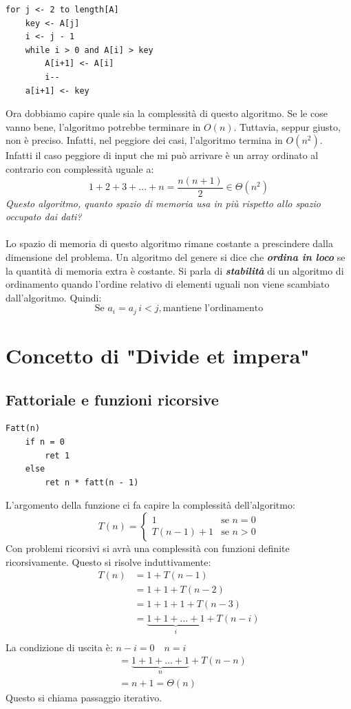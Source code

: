 \documentclass[a4paper]{article}
\begin{document}
\begin{lstlisting}
for j <- 2 to length[A]
    key <- A[j]
    i <- j - 1
    while i > 0 and A[i] > key
        A[i+1] <- A[i]
        i--
    a[i+1] <- key
\end{lstlisting}
Ora dobbiamo capire quale sia la complessità di questo algoritmo. Se le cose vanno bene, l'algoritmo potrebbe terminare in $O(n)$. Tuttavia, seppur giusto, non è preciso. Infatti, nel peggiore dei casi, l'algoritmo termina in $O(n^2)$. Infatti il caso peggiore di input che mi può arrivare è un array ordinato al contrario con complessità uguale a:
\[1 + 2 + 3 + ... + n = \frac{n(n+1)}{2} \in \Theta(n^2)\]
\textit{Questo algoritmo, quanto spazio di memoria usa in più rispetto allo spazio occupato dai dati? }
\\\\
Lo spazio di memoria di questo algoritmo rimane costante a prescindere dalla dimensione del problema. Un algoritmo del genere si dice che \textit{\textbf{ordina in loco}} se la quantità di memoria extra è costante. Si parla di \textit{\textbf{stabilità}} di un algoritmo di ordinamento quando l'ordine relativo di elementi uguali non viene scambiato dall'algoritmo. Quindi:
\[\text{Se } a_i = a_j \, i < j, \text{mantiene l'ordinamento}\]


\section{Concetto di "Divide et impera"}

\subsection{Fattoriale e funzioni ricorsive}

\begin{lstlisting}
Fatt(n)
    if n = 0
        ret 1
    else
        ret n * fatt(n - 1)
\end{lstlisting}

L'argomento della funzione ci fa capire la complessità dell'algoritmo:
\[
  T(n) = \begin{cases}
    1 & \text{se } n = 0 \\
    T(n - 1) + 1 & \text{se } n > 0
  \end{cases}
\]
Con problemi ricorsivi si avrà una complessità con funzioni definite ricorsivamente.
Questo si risolve induttivamente:
\[
  \begin{aligned}
    T(n) & = 1 + T(n-1)\\
         & = 1 + 1 + T(n-2)\\
         & = 1 + 1 + 1 + T(n-3)\\
         & = \underbrace{1 + 1 + \ldots + 1}_{i} + T(n-i)\\
  \end{aligned}
\]
La condizione di uscita è: \( n-i = 0 \quad n = i \)
\[
\begin{aligned}
         & = \underbrace{1 + 1 + \ldots + 1}_{n} + T(n-n)\\
         & = n + 1 = \Theta(n)
\end{aligned}
\]
Questo si chiama passaggio iterativo.
\end{document}
